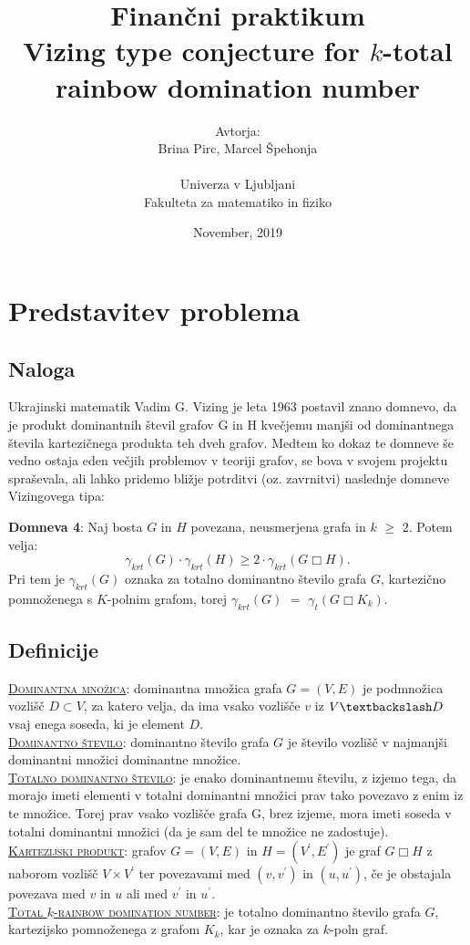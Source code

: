 \documentclass[12pt, a4paper]{article}
\title{ Finančni praktikum \\\vspace{3cm} {\huge \textbf{Vizing type conjecture for $k$-total rainbow domination number}}\vspace{8mm}}
\author{Avtorja: \\[1.5mm] Brina Pirc, Marcel Špehonja \\ \vspace{6cm}
\\ Univerza v Ljubljani \\[1.5mm]
Fakulteta za matematiko in fiziko \vspace{2cm}}
\date{November, 2019}
\begin{document}
\begin{titlepage}
\clearpage \maketitle
\thispagestyle{empty}
\end{titlepage}

\hypersetup{hidelinks}
\thispagestyle{empty}
\hypersetup{linkcolor = black}
\tableofcontents
\pagebreak


\section{Predstavitev problema}
\subsection{Naloga}
Ukrajinski matematik Vadim G. Vizing je leta 1963 postavil znano domnevo, da je produkt dominantnih števil grafov G in H kvečjemu manjši od dominantnega števila kartezičnega produkta teh dveh grafov. Medtem ko dokaz te domneve še vedno ostaja eden večjih problemov v teoriji grafov, se bova v svojem projektu spraševala, ali lahko pridemo bližje potrditvi (oz. zavrnitvi) naslednje domneve Vizingovega tipa: 

\textbf{Domneva 4}:  Naj bosta $G$ in $H$ povezana, neusmerjena grafa in $k$ $\geq$ $2$. Potem velja: $$\gamma_{krt}(G) \cdot \gamma_{krt}(H) \geq 2 \cdot \gamma_{krt}(G \Box H).$$
Pri tem je $\gamma_{krt}(G)$ oznaka za totalno dominantno število grafa $G$, kartezično pomnoženega s $K$-polnim grafom, torej $\gamma_{krt}(G)$ $=$ $\gamma_{t}(G \Box K_k)$.

\subsection{Definicije}

\underline{\textsc{Dominantna množica}}: dominantna množica grafa $G = (V,E)$ je podmnožica vozlišč $D \subset V$, za katero velja, da ima vsako vozlišče $v$ iz $V \textbackslash D$ vsaj enega soseda, ki je element $D$. \\
\underline{\textsc{Dominantno število}}: dominantno število grafa $G$ je število vozlišč v najmanjši dominantni množici dominantne množice. \\
\underline{\textsc{Totalno dominantno število}}: je enako dominantnemu številu, z izjemo tega, da morajo imeti elementi v totalni dominantni množici prav tako povezavo z enim iz te množice. Torej prav vsako vozlišče grafa G, brez izjeme, mora imeti soseda v totalni dominantni množici (da je sam del te množice ne zadostuje). \\
\underline{\textsc{Kartezijski produkt}}: grafov $G = (V, E)$ in $H = (V^{\prime}, E^{\prime})$ je graf $G \Box H$ z naborom vozlišč $V \times V^{\prime}$ ter povezavami med $(v, v^{\prime})$ in $(u, u^{\prime})$, če je obstajala povezava med $v$ in $u$ ali med $v^{\prime}$ in $u^{\prime}$. \\
\underline{\textsc{Total $k$-rainbow domination number}}: je totalno dominantno število grafa $G$, kartezijsko pomnoženega z grafom $K_k$, kar je oznaka za $k$-poln graf. \\
\end{document}
